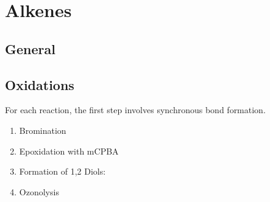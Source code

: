 \section{Alkenes}

\subsection{General}


\subsection{Oxidations}

For each reaction, the first step involves synchronous bond formation.

\begin{enumerate}
	\item Bromination
	\item Epoxidation with mCPBA
	\item Formation of 1,2 Diols:
	\item Ozonolysis
\end{enumerate}